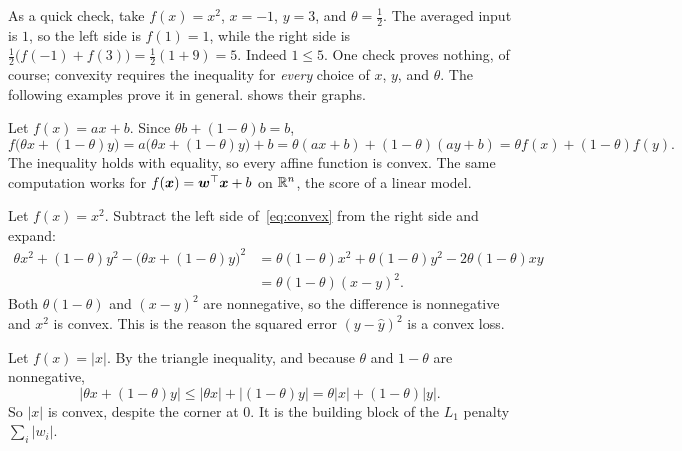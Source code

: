 As a quick check, take $f(x) = x^2$, $x = -1$, $y = 3$, and
$\theta = \tfrac12$. The averaged input is $1$, so the left side is
$f(1) = 1$, while the right side is $\tfrac12 \bigl(f(-1) + f(3)\bigr) =
\tfrac12 (1 + 9) = 5$. Indeed $1 \le 5$. One check proves nothing, of
course; convexity requires the inequality for \emph{every} choice of $x$,
$y$, and $\theta$. The following examples prove it in general.
 shows their graphs.

\begin{example}
  \label{ex:ch01-affine}
  Let $f(x) = ax + b$. Since $\theta b + (1 - \theta) b = b$,
  \[
    f\bigl(\theta x + (1 - \theta) y\bigr)
    = a\bigl(\theta x + (1 - \theta) y\bigr) + b
    = \theta (a x + b) + (1 - \theta)(a y + b)
    = \theta f(x) + (1 - \theta) f(y).
  \]
  The inequality holds with equality, so every affine function is convex.
  The same computation works for $f(\bm{x}) = \bm{w}^\top \bm{x} + b$
  on $\mathbb{R}^n$, the score of a linear model.
\end{example}

\begin{example}
  \label{ex:ch01-square}
  Let $f(x) = x^2$. Subtract the left side of~\eqref{eq:convex} from the
  right side and expand:
  \begin{align*}
    \theta x^2 + (1 - \theta) y^2 - \bigl(\theta x + (1 - \theta) y\bigr)^2
    &= \theta (1 - \theta) x^2 + \theta (1 - \theta) y^2
       - 2 \theta (1 - \theta) x y \\
    &= \theta (1 - \theta) (x - y)^2 .
  \end{align*}
  Both $\theta (1 - \theta)$ and $(x - y)^2$ are nonnegative, so the
  difference is nonnegative and $x^2$ is convex. This is the reason the
  squared error $(y - \hat{y})^2$ is a convex loss.
\end{example}

\begin{example}
  \label{ex:ch01-abs}
  Let $f(x) = |x|$. By the triangle inequality, and because $\theta$ and
  $1 - \theta$ are nonnegative,
  \[
    \bigl|\theta x + (1 - \theta) y\bigr|
    \le |\theta x| + |(1 - \theta) y|
    = \theta |x| + (1 - \theta) |y|.
  \]
  So $|x|$ is convex, despite the corner at $0$. It is the building block of
  the $L_1$ penalty $\sum_i |w_i|$.
\end{example}

